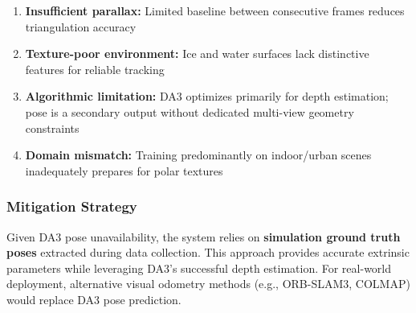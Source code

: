 \begin{enumerate}
    \item \textbf{Insufficient parallax:} Limited baseline between consecutive frames reduces triangulation accuracy
    \item \textbf{Texture-poor environment:} Ice and water surfaces lack distinctive features for reliable tracking
    \item \textbf{Algorithmic limitation:} DA3 optimizes primarily for depth estimation; pose is a secondary output without dedicated multi-view geometry constraints
    \item \textbf{Domain mismatch:} Training predominantly on indoor/urban scenes inadequately prepares for polar textures
\end{enumerate}

\subsubsection{Mitigation Strategy}

Given DA3 pose unavailability, the system relies on \textbf{simulation ground truth poses} extracted during data collection. This approach provides accurate extrinsic parameters while leveraging DA3's successful depth estimation. For real-world deployment, alternative visual odometry methods (e.g., ORB-SLAM3, COLMAP) would replace DA3 pose prediction.
